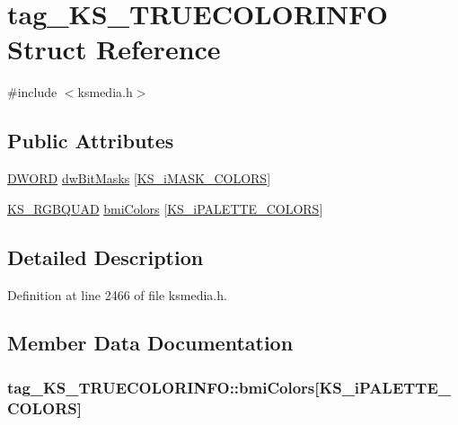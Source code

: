 \hypertarget{structtag___k_s___t_r_u_e_c_o_l_o_r_i_n_f_o}{}\section{tag\+\_\+\+K\+S\+\_\+\+T\+R\+U\+E\+C\+O\+L\+O\+R\+I\+N\+FO Struct Reference}
\label{structtag___k_s___t_r_u_e_c_o_l_o_r_i_n_f_o}


{\ttfamily \#include $<$ksmedia.\+h$>$}

\subsection*{Public Attributes}
\begin{DoxyCompactItemize}
\item 
\hyperlink{mapinls_8h_ad342ac907eb044443153a22f964bf0af}{D\+W\+O\+RD} \hyperlink{structtag___k_s___t_r_u_e_c_o_l_o_r_i_n_f_o_a0b0414de5c030f6350a8280675a44d8c}{dw\+Bit\+Masks} \mbox{[}\hyperlink{ksmedia_8h_aa9ac4ee1a8eb49371551b3fcc788d1a2}{K\+S\+\_\+i\+M\+A\+S\+K\+\_\+\+C\+O\+L\+O\+RS}\mbox{]}
\item 
\hyperlink{ksmedia_8h_ae45da45c9265515c30d4fda6c6d353ad}{K\+S\+\_\+\+R\+G\+B\+Q\+U\+AD} \hyperlink{structtag___k_s___t_r_u_e_c_o_l_o_r_i_n_f_o_ad9fa13d717f5c2ebfb92b480c600a23b}{bmi\+Colors} \mbox{[}\hyperlink{ksmedia_8h_a1b6b2c1c243617aa373aefb6afbf1489}{K\+S\+\_\+i\+P\+A\+L\+E\+T\+T\+E\+\_\+\+C\+O\+L\+O\+RS}\mbox{]}
\end{DoxyCompactItemize}


\subsection{Detailed Description}


Definition at line 2466 of file ksmedia.\+h.



\subsection{Member Data Documentation}
\subsubsection[{\texorpdfstring{bmi\+Colors}{bmiColors}}]{ tag\+\_\+\+K\+S\+\_\+\+T\+R\+U\+E\+C\+O\+L\+O\+R\+I\+N\+F\+O\+::bmi\+Colors\mbox{[}{\bf K\+S\+\_\+i\+P\+A\+L\+E\+T\+T\+E\+\_\+\+C\+O\+L\+O\+RS}\mbox{]}}\hypertarget{structtag___k_s___t_r_u_e_c_o_l_o_r_i_n_f_o_ad9fa13d717f5c2ebfb92b480c600a23b}{}\label{structtag___k_s___t_r_u_e_c_o_l_o_r_i_n_f_o_ad9fa13d717f5c2ebfb92b480c600a23b}


